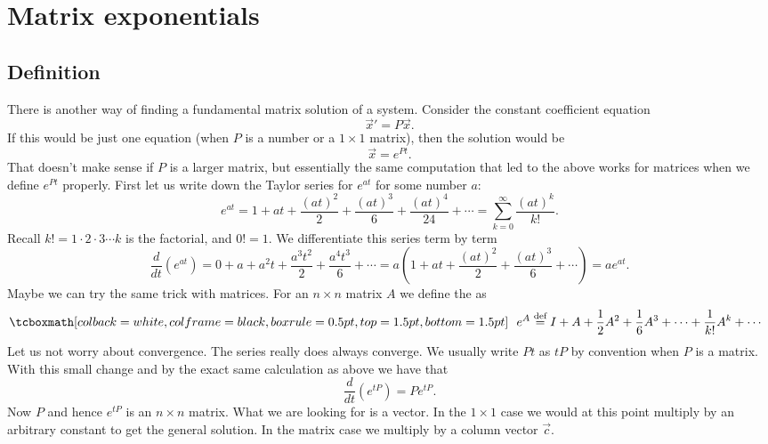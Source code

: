 
\sectionnewpage
\section{Matrix exponentials} \label{sec:matexp}



\subsection{Definition}

There is another way of finding a fundamental
matrix solution of a system.  Consider the constant
coefficient equation
\begin{equation*}
{\vec{x}}' = P \vec{x} .
\end{equation*}
If this would be just one equation (when $P$ is a number or a $1
\times 1$ matrix), then the solution would be
\begin{equation*}
\vec{x} = e^{Pt} .
\end{equation*}
That doesn't make sense if $P$ is a larger matrix, but
essentially the same computation that led to the above
works for matrices when we define
$e^{Pt}$ properly.  First let us write down the Taylor series for $e^{at}$
for some number $a$:
\begin{equation*}
e^{at} = 1 + at
+ \frac{{(at)}^2}{2}
+ \frac{{(at)}^3}{6}
+ \frac{{(at)}^4}{24}
+ \cdots
= \sum_{k=0}^\infty \frac{{(at)}^k}{k!} .
\end{equation*}
Recall $k! = 1 \cdot 2 \cdot 3 \cdots k$ is the factorial, and $0! = 1$.
We differentiate this series term by term
\begin{equation*}
\frac{d}{dt} \left(e^{at} \right) = 
0
+ a
+ a^2 t
+ \frac{a^3t^2}{2}
+ \frac{a^4t^3}{6}
+ \cdots
= a \left(
1
+ a t
+ \frac{{(at)}^2}{2}
+ \frac{{(at)}^3}{6}
+ \cdots \right)
= a e^{at}.
\end{equation*}
Maybe we can try the same trick with matrices.  For an $n \times n$
matrix $A$ we define the
\emph{} as
\begin{equation*}
\mybxbg{~~
e^A \overset{\text{def}}{=} I + A + \frac{1}{2} A^2 + 
\frac{1}{6} A^3 + \cdots + \frac{1}{k!} A^k + \cdots
~~}
\end{equation*}
Let us not worry about convergence.  The series really does
always converge.
We usually write $Pt$ as $tP$ by convention when $P$ is a matrix.
With this small change and by the exact same
calculation as above
we have that
\begin{equation*}
\frac{d}{dt} \left(e^{tP} \right) = 
P e^{tP} .
\end{equation*}
Now $P$ and hence $e^{tP}$ is an $n \times n$ matrix.  What we are looking
for is a vector.  In the $1 \times 1$ case we would at this
point multiply by an arbitrary constant to get the general solution.  In the
matrix case we multiply by a column vector $\vec{c}$.

